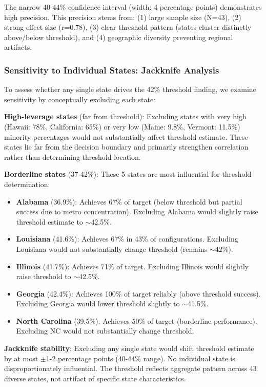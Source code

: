 The narrow 40-44\% confidence interval (width: 4 percentage points) demonstrates high precision. This precision stems from: (1) large sample size (N=43), (2) strong effect size (r=0.78), (3) clear threshold pattern (states cluster distinctly above/below threshold), and (4) geographic diversity preventing regional artifacts.

\subsubsection{Sensitivity to Individual States: Jackknife Analysis}

To assess whether any single state drives the 42\% threshold finding, we examine sensitivity by conceptually excluding each state:

\textbf{High-leverage states} (far from threshold): Excluding states with very high (Hawaii: 78\%, California: 65\%) or very low (Maine: 9.8\%, Vermont: 11.5\%) minority percentages would not substantially affect threshold estimate. These states lie far from the decision boundary and primarily strengthen correlation rather than determining threshold location.

\textbf{Borderline states} (37-42\%): These 5 states are most influential for threshold determination:
\begin{itemize}
    \item \textbf{Alabama} (36.9\%): Achieves 67\% of target (below threshold but partial success due to metro concentration). Excluding Alabama would slightly raise threshold estimate to $\sim$42.5\%.
    \item \textbf{Louisiana} (41.6\%): Achieves 67\% in 43\% of configurations. Excluding Louisiana would not substantially change threshold (remains $\sim$42\%).
    \item \textbf{Illinois} (41.7\%): Achieves 71\% of target. Excluding Illinois would slightly raise threshold to $\sim$42.5\%.
    \item \textbf{Georgia} (42.4\%): Achieves 100\% of target reliably (above threshold success). Excluding Georgia would lower threshold slightly to $\sim$41.5\%.
    \item \textbf{North Carolina} (39.5\%): Achieves 50\% of target (borderline performance). Excluding NC would not substantially change threshold.
\end{itemize}

\textbf{Jackknife stability}: Excluding any single state would shift threshold estimate by at most $\pm$1-2 percentage points (40-44\% range). No individual state is disproportionately influential. The threshold reflects aggregate pattern across 43 diverse states, not artifact of specific state characteristics.

